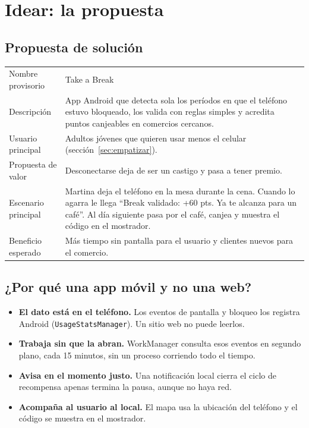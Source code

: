 \section{Idear: la propuesta}
\label{sec:idear}

\subsection{Propuesta de solución}

\begin{table}[H]
\centering\small
\begin{tabularx}{\textwidth}{@{}l L@{}}
\toprule
Nombre provisorio & Take a Break \\
Descripción & App Android que detecta sola los períodos en que el teléfono estuvo bloqueado, los valida con reglas simples y acredita puntos canjeables en comercios cercanos. \\
Usuario principal & Adultos jóvenes que quieren usar menos el celular (sección~\ref{sec:empatizar}). \\
Propuesta de valor & Desconectarse deja de ser un castigo y pasa a tener premio. \\
Escenario principal & Martina deja el teléfono en la mesa durante la cena. Cuando lo agarra le llega “Break validado: +60 pts. Ya te alcanza para un café”. Al día siguiente pasa por el café, canjea y muestra el código en el mostrador. \\
Beneficio esperado & Más tiempo sin pantalla para el usuario y clientes nuevos para el comercio. \\
\bottomrule
\end{tabularx}
\end{table}

\subsection{¿Por qué una app móvil y no una web?}

\begin{itemize}
\item \textbf{El dato está en el teléfono.} Los eventos de pantalla y bloqueo los registra Android (\texttt{UsageStatsManager}). Un sitio web no puede leerlos.
\item \textbf{Trabaja sin que la abran.} WorkManager consulta esos eventos en segundo plano, cada 15 minutos, sin un proceso corriendo todo el tiempo.
\item \textbf{Avisa en el momento justo.} Una notificación local cierra el ciclo de recompensa apenas termina la pausa, aunque no haya red.
\item \textbf{Acompaña al usuario al local.} El mapa usa la ubicación del teléfono y el código se muestra en el mostrador.
\end{itemize}

